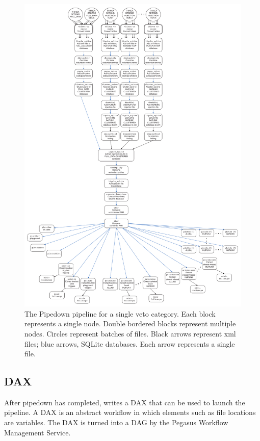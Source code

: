 \begin{figure}[p]
\begin{center}
\includegraphics[width=5in]{figures/PipedownDiagram.pdf}
\end{center}
\caption{
The Pipedown pipeline for a single veto category. Each block represents a single node. Double bordered blocks represent multiple nodes. Circles represent batches of files. Black arrows represent xml files; blue arrows, SQLite databases. Each arrow represents a single file.
}
\label{fig:PipedownDiagram}
\end{figure}

\subsection{DAX}

After pipedown has completed, \ihope writes a DAX that can be used to launch the pipeline. A DAX is an abstract workflow in which elements such as file locations are variables. The DAX is turned into a \ac{DAG} by the Pegasus Workflow Management Service.

